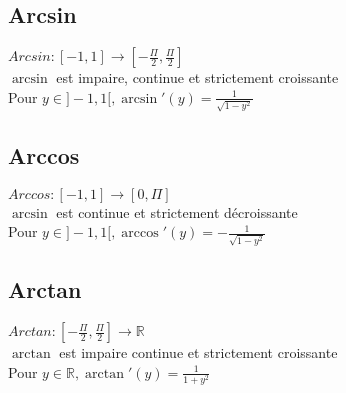 \documentclass[fleqn]{article}
\begin{document}
\subsection{Arcsin}
\(Arcsin: [-1,1] \rightarrow [-\frac{\Pi}{2}, \frac{\Pi}{2}]\) \\
\(\arcsin\) est impaire, continue et strictement croissante \\
Pour \(y \in ]-1,1[, \arcsin'(y) = \frac{1}{\sqrt{1-y^2}}\) \\

\subsection{Arccos}
\(Arccos: [-1,1] \rightarrow [0, \Pi]\) \\
\(\arcsin\) est continue et strictement d\'{e}croissante \\
Pour \(y \in ]-1,1[, \arccos'(y) = -\frac{1}{\sqrt{1-y^2}}\) \\

\subsection{Arctan}
\(Arctan: [-\frac{\Pi}{2},\frac{\Pi}{2}] \rightarrow \mathbb{R}\) \\
\(\arctan\) est impaire continue et strictement croissante \\
Pour \(y \in \mathbb{R}, \arctan'(y) = \frac{1}{1+y^2}\) \\
\end{document}
